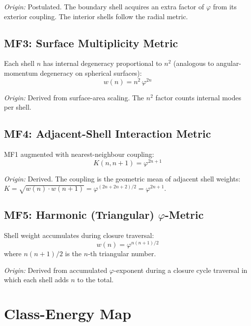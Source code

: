 \documentclass[12pt]{article}
\newcommand{\phig}{\varphi}
\begin{document}
\textit{Origin:} Postulated. The boundary shell acquires an extra factor of $\phig$ from its exterior coupling. The interior shells follow the radial metric.

\subsection{MF3: Surface Multiplicity Metric}

Each shell $n$ has internal degeneracy proportional to $n^2$ (analogous to angular-momentum degeneracy on spherical surfaces):
\begin{equation}
    w(n) = n^2\, \phig^{2n}
\end{equation}

\textit{Origin:} Derived from surface-area scaling. The $n^2$ factor counts internal modes per shell.

\subsection{MF4: Adjacent-Shell Interaction Metric}

MF1 augmented with nearest-neighbour coupling:
\begin{equation}
    K(n, n{+}1) = \phig^{2n+1}
\end{equation}

\textit{Origin:} Derived. The coupling is the geometric mean of adjacent shell weights: $K = \sqrt{w(n) \cdot w(n{+}1)} = \phig^{(2n + 2n+2)/2} = \phig^{2n+1}$.

\subsection{MF5: Harmonic (Triangular) $\phig$-Metric}

Shell weight accumulates during closure traversal:
\begin{equation}
    w(n) = \phig^{n(n+1)/2}
\end{equation}
where $n(n{+}1)/2$ is the $n$-th triangular number.

\textit{Origin:} Derived from accumulated $\phig$-exponent during a closure cycle traversal in which each shell adds $n$ to the total.

\section{Class-Energy Map}\label{sec:energy}
\end{document}
